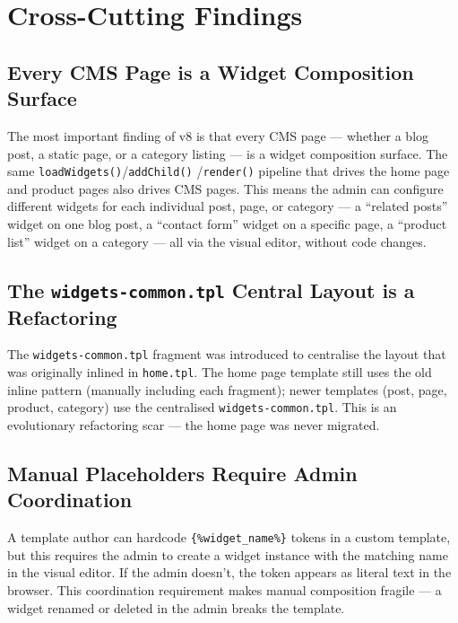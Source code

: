 \documentclass[11pt,a4paper]{article}
\begin{document}
\section{Cross-Cutting Findings}\label{sec:findings}

\subsection{Every CMS Page is a Widget Composition Surface}

The most important finding of v8 is that every CMS page --- whether a
blog post, a static page, or a category listing --- is a widget
composition surface. The same \texttt{loadWidgets()}/\texttt{addChild()}
/\texttt{render()} pipeline that drives the home page and product pages
also drives CMS pages. This means the admin can configure different
widgets for each individual post, page, or category --- a ``related
posts'' widget on one blog post, a ``contact form'' widget on a specific
page, a ``product list'' widget on a category --- all via the visual
editor, without code changes.

\subsection{The \texttt{widgets-common.tpl} Central Layout is a Refactoring}

The \texttt{widgets-common.tpl} fragment was introduced to centralise the
layout that was originally inlined in \texttt{home.tpl}. The home page
template still uses the old inline pattern (manually including each
fragment); newer templates (post, page, product, category) use the
centralised \texttt{widgets-common.tpl}. This is an evolutionary
refactoring scar --- the home page was never migrated.

\subsection{Manual Placeholders Require Admin Coordination}

A template author can hardcode \texttt{\{\%widget\_name\%\}} tokens in a
custom template, but this requires the admin to create a widget instance
with the matching name in the visual editor. If the admin doesn't, the
token appears as literal text in the browser. This coordination
requirement makes manual composition fragile --- a widget renamed or
deleted in the admin breaks the template.
\end{document}
